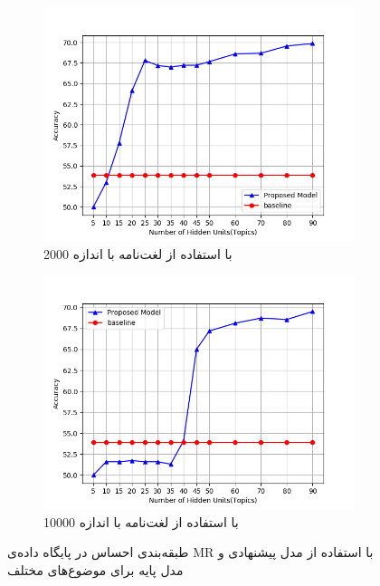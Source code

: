 \begin{figure}[!t]
	\centering
	\begin{subfigure}{.45\textwidth}
		\includegraphics[scale = .4]{chap5-img/sc-a}
		\caption{ با استفاده از  لغت‌نامه با اندازه 2000}
		\label{chap5-fig5sub1}
	\end{subfigure}		
	\begin{subfigure}{.45\textwidth}
		\includegraphics[scale =.4]{chap5-img/sc-b}
		\caption{ با استفاده از  لغت‌نامه با اندازه 10000 }
		\label{chap5-fig5sub2}
	\end{subfigure}
	\caption{طبقه‌بندی احساس در پایگاه داده‌ی MR با استفاده از مدل پیشنهادی و مدل پایه برای موضوع‌های مختلف }
	\label{chap5-fig5}
\end{figure}

